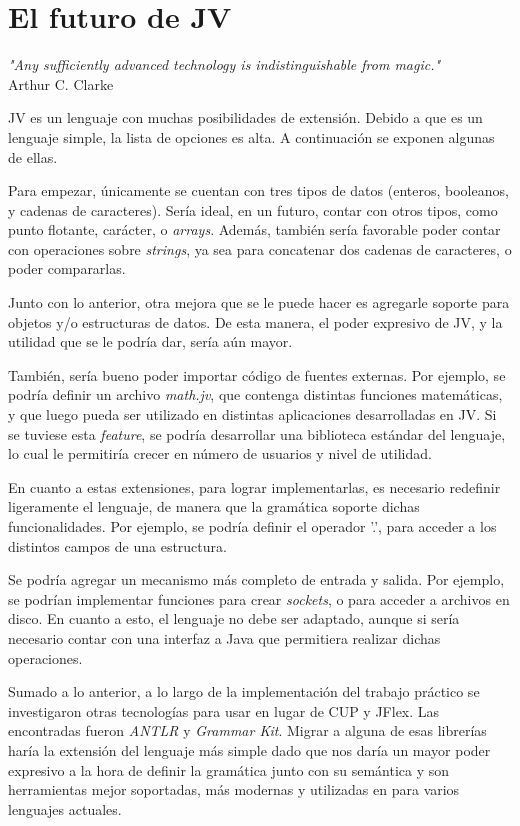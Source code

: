 \documentclass{article}
\begin{document}
    \section{El futuro de JV}
        \begin{center}
            \par\textit{"Any sufficiently advanced technology is indistinguishable from magic."}\\Arthur C. Clarke\\
        \end{center}
        \par JV es un lenguaje con muchas posibilidades de extensión. Debido a que es un lenguaje simple, la lista de opciones es alta. A continuación se exponen algunas de ellas.
        \par Para empezar, únicamente se cuentan con tres tipos de datos (enteros, booleanos, y cadenas de caracteres). Sería ideal, en un futuro, contar con otros tipos, como punto flotante, carácter, o \textit{arrays}. Además, también sería favorable poder contar con operaciones sobre \textit{strings}, ya sea para concatenar dos cadenas de caracteres, o poder compararlas.
        \par Junto con lo anterior, otra mejora que se le puede hacer es agregarle soporte para objetos y/o estructuras de datos. De esta manera, el poder expresivo de JV, y la utilidad que se le podría dar, sería aún mayor.
        \par También, sería bueno poder importar código de fuentes externas. Por ejemplo, se podría definir un archivo \textit{math.jv}, que contenga distintas funciones matemáticas, y que luego pueda ser utilizado en distintas aplicaciones desarrolladas en JV. Si se tuviese esta \textit{feature}, se podría desarrollar una biblioteca estándar del lenguaje, lo cual le permitiría crecer en número de usuarios y nivel de utilidad.
        \par En cuanto a estas extensiones, para lograr implementarlas, es necesario redefinir ligeramente el lenguaje, de manera que la gramática soporte dichas funcionalidades. Por ejemplo, se podría definir el operador '.', para acceder a los distintos campos de una estructura.
        \par Se podría agregar un mecanismo más completo de entrada y salida. Por ejemplo, se podrían implementar funciones para crear \textit{sockets}, o para acceder a archivos en disco. En cuanto a esto, el lenguaje no debe ser adaptado, aunque si sería necesario contar con una interfaz a Java que permitiera realizar dichas operaciones.
            \par Sumado a lo anterior, a lo largo de la implementación del trabajo práctico se investigaron otras tecnologías para usar en lugar de CUP y JFlex. Las encontradas fueron \textit{ANTLR} y \textit{Grammar Kit}. Migrar a alguna de esas librerías haría la extensión del lenguaje más simple dado que nos daría un mayor poder expresivo a la hora de definir la gramática junto con su semántica y son herramientas mejor soportadas, más modernas y utilizadas en para varios lenguajes actuales.
    \clearpage
\end{document}
